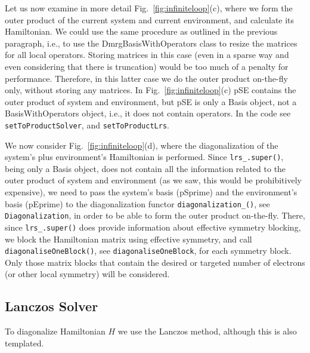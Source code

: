 \documentclass[paper=letter]{scrartcl}
\newcommand{\cppClass}[1]{{\sffamily #1}}
\newcommand{\cppFunction}[1]{{\tt #1}}
\begin{document}
Let us now examine in more detail Fig.~\ref{fig:infiniteloop}(c), where 
we form the outer product of the current system and current environment, and calculate its Hamiltonian.
We could use the same procedure as outlined in the previous paragraph, i.e., to use the DmrgBasisWithOperators class
to resize the matrices for all local operators.
Storing matrices in this case (even in a sparse way and even considering that there is truncation) would be too much of
a penalty for performance. Therefore, in this latter case we do the outer product on-the-fly only, without storing any matrices. 
In Fig.~\ref{fig:infiniteloop}(c)  pSE contains the outer product
of system and environment, but pSE is only a \cppClass{Basis} object, not a \cppClass{BasisWithOperators} object, i.e., it does not
contain operators. In the code see \cppFunction{setToProductSolver}, and \cppFunction{setToProductLrs}. 

We now consider Fig.~\ref{fig:infiniteloop}(d), where the diagonalization of the  system's plus environment's Hamiltonian is performed.
Since \verb!lrs_.super()!, being only a \cppClass{Basis} object, does not contain all the information related to the outer product of system and environment 
(as we saw, this would be prohibitively expensive), we need to pass the system's basis (pSprime) and the environment's basis (pEprime) to
the diagonalization functor \cppFunction{diagonalization\_()}, see \cppFunction{Diagonalization}, in order to be able to form the outer product on-the-fly.
There,  since \verb!lrs_.super()! does provide information about effective symmetry blocking, we block the Hamiltonian matrix using effective symmetry,
and call  \cppFunction{diagonaliseOneBlock()}, see  \cppFunction{diagonaliseOneBlock}, for each symmetry block. Only those matrix blocks
that contain the desired or targeted number of electrons (or other local symmetry) will be considered.

\subsection{Lanczos Solver}
To diagonalize Hamiltonian $H$ we use the Lanczos method\cite{re:lanczos50,re:pettifor85}, although this is also templated. 
\end{document}
